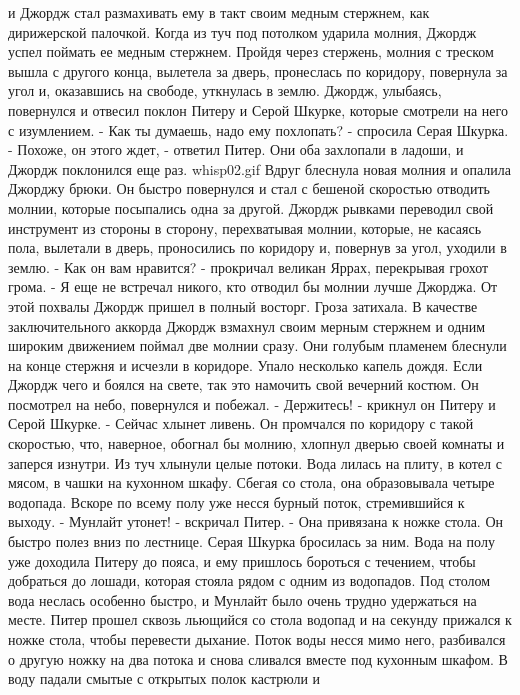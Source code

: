 и Джордж стал размахивать ему в такт своим медным стержнем, как 
дирижерской палочкой. Когда из туч под потолком ударила молния, Джордж 
успел поймать ее медным стержнем. Пройдя через стержень, молния с 
треском вышла с другого конца, вылетела за дверь, пронеслась по 
коридору, повернула за угол и, оказавшись на свободе, уткнулась в 
землю.
    Джордж, улыбаясь, повернулся и отвесил поклон Питеру и Серой 
Шкурке, которые смотрели на него с изумлением.
    - Как ты думаешь, надо ему похлопать? - спросила Серая Шкурка.
    - Похоже, он этого ждет, - ответил Питер.
    Они оба захлопали в ладоши, и Джордж поклонился еще раз.
    {whisp02.gif}
    Вдруг блеснула новая молния и опалила Джорджу брюки. Он быстро 
повернулся и стал с бешеной скоростью отводить молнии, которые 
посыпались одна за другой. Джордж рывками переводил свой инструмент из 
стороны в сторону, перехватывая молнии, которые, не касаясь пола, 
вылетали в дверь, проносились по коридору и, повернув за угол, уходили 
в землю.
    - Как он вам нравится? - прокричал великан Яррах, перекрывая 
грохот грома. - Я еще не встречал никого, кто отводил бы молнии лучше 
Джорджа.
    От этой похвалы Джордж пришел в полный восторг. Гроза затихала. В 
качестве заключительного аккорда Джордж взмахнул своим мерным стержнем 
и одним широким движением поймал две молнии сразу. Они голубым 
пламенем блеснули на конце стержня и исчезли в коридоре.
    Упало несколько капель дождя. Если Джордж чего и боялся на свете, 
так это намочить свой вечерний костюм. Он посмотрел на небо, 
повернулся и побежал.
    - Держитесь! - крикнул он Питеру и Серой Шкурке. - Сейчас хлынет 
ливень.
    Он промчался по коридору с такой скоростью, что, наверное, обогнал 
бы молнию, хлопнул дверью своей комнаты и заперся изнутри.
    Из туч хлынули целые потоки. Вода лилась на плиту, в котел с 
мясом, в чашки на кухонном шкафу. Сбегая со стола, она образовывала 
четыре водопада. Вскоре по всему полу уже несся бурный поток, 
стремившийся к выходу.
    - Мунлайт утонет! - вскричал Питер. - Она привязана к ножке стола.
    Он быстро полез вниз по лестнице. Серая Шкурка бросилась за ним. 
Вода на полу уже доходила Питеру до пояса, и ему пришлось бороться с 
течением, чтобы добраться до лошади, которая стояла рядом с одним из 
водопадов. Под столом вода неслась особенно быстро, и Мунлайт было 
очень трудно удержаться на месте.
    Питер прошел сквозь льющийся со стола водопад и на секунду 
прижался к ножке стола, чтобы перевести дыхание. Поток воды несся мимо 
него, разбивался о другую ножку на два потока и снова сливался вместе 
под кухонным шкафом. В воду падали смытые с открытых полок кастрюли и 
